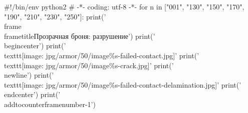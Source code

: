 \documentclass[xcolor={usenames,dvipsnames,svgnames,table}]{beamer}
\begin{document}

\begin{python}
#!/bin/env python2
# -*- coding: utf-8 -*-
for n in ["001", "130", "150", "170", "190", "210", "230", "250"]:
    print('\\frame{\\frametitle{Прозрачная броня: разрушение}')
    print('\\begin{center}')
    print('\\texttt{[image: jpg/armor/50/image\%s-failed-contact.jpg]}' %
    print('\\texttt{[image: jpg/armor/50/image\%s-crack.jpg]}' %
    print('\\newline')
    print('\\texttt{[image: jpg/armor/50/image\%s-failed-contact-delamination.jpg]}' %
    print('\\end{center}}')
    print('\\addtocounter{framenumber}{-1}')
\end{python}
\end{document}
